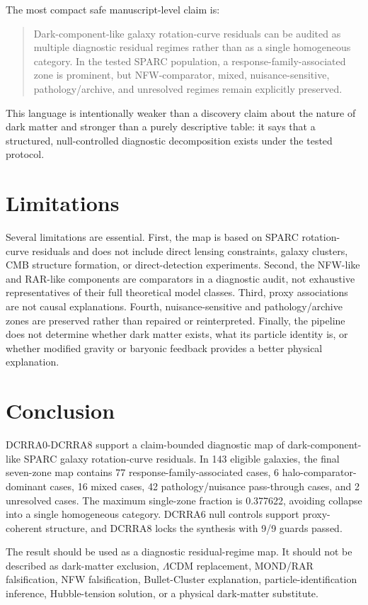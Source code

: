 \documentclass[11pt,a4paper]{article}
\begin{document}
The most compact safe manuscript-level claim is:
\begin{quote}
Dark-component-like galaxy rotation-curve residuals can be audited as multiple diagnostic residual regimes rather than as a single homogeneous category. In the tested SPARC population, a response-family-associated zone is prominent, but NFW-comparator, mixed, nuisance-sensitive, pathology/archive, and unresolved regimes remain explicitly preserved.
\end{quote}

This language is intentionally weaker than a discovery claim about the nature of dark matter and stronger than a purely descriptive table: it says that a structured, null-controlled diagnostic decomposition exists under the tested protocol.

\section{Limitations}
Several limitations are essential. First, the map is based on SPARC rotation-curve residuals and does not include direct lensing constraints, galaxy clusters, CMB structure formation, or direct-detection experiments. Second, the NFW-like and RAR-like components are comparators in a diagnostic audit, not exhaustive representatives of their full theoretical model classes. Third, proxy associations are not causal explanations. Fourth, nuisance-sensitive and pathology/archive zones are preserved rather than repaired or reinterpreted. Finally, the pipeline does not determine whether dark matter exists, what its particle identity is, or whether modified gravity or baryonic feedback provides a better physical explanation.

\section{Conclusion}
DCRRA0-DCRRA8 support a claim-bounded diagnostic map of dark-component-like SPARC galaxy rotation-curve residuals. In 143 eligible galaxies, the final seven-zone map contains 77 response-family-associated cases, 6 halo-comparator-dominant cases, 16 mixed cases, 42 pathology/nuisance pass-through cases, and 2 unresolved cases. The maximum single-zone fraction is 0.377622, avoiding collapse into a single homogeneous category. DCRRA6 null controls support proxy-coherent structure, and DCRRA8 locks the synthesis with 9/9 guards passed.

The result should be used as a diagnostic residual-regime map. It should not be described as dark-matter exclusion, $\Lambda$CDM replacement, MOND/RAR falsification, NFW falsification, Bullet-Cluster explanation, particle-identification inference, Hubble-tension solution, or a physical dark-matter substitute.
\end{document}
